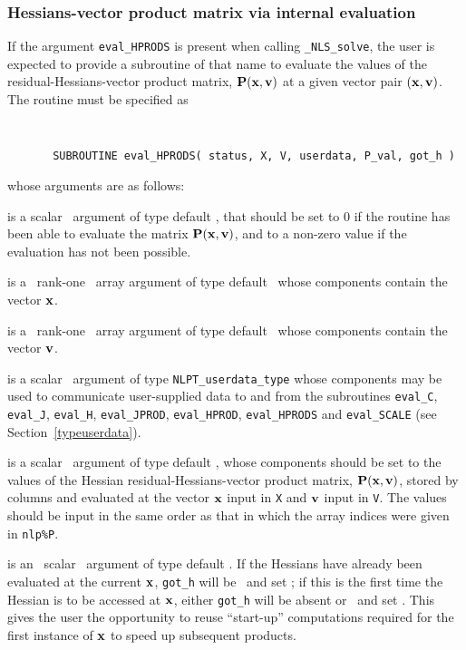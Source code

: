 \documentclass{galahad}
\newcommand{\packagename}{NLS}
\newcommand{\fullpackagename}{\libraryname\_\packagename}
\newcommand{\solver}{{\tt \fullpackagename\_solve}}
\begin{document}

\subsubsection{Hessians-vector product matrix via internal evaluation\label{hpfv}}

If the argument {\tt eval\_HPRODS} is present when calling \solver, the
user is expected to provide a subroutine of that name to evaluate the
values of the residual-Hessians-vector product matrix, ${\mathbf{P}}({\mathbf{x}},{\mathbf{v}})$
at a given vector pair $({\mathbf{x}},{\mathbf{v}})$.
The routine must be specified as
\def\baselinestretch{0.8}
{\tt
\begin{verbatim}
       SUBROUTINE eval_HPRODS( status, X, V, userdata, P_val, got_h )
\end{verbatim} }
\def\baselinestretch{1.0}
\noindent whose arguments are as follows:

\begin{description}
 is a scalar \intentout\ argument of type default \integer,
that should be set to 0 if the routine has been able to evaluate the
matrix ${\mathbf{P}}({\mathbf{x}},{\mathbf{v}})$,
and to a non-zero value if the evaluation has not been possible.

 is a \ rank-one \intentin\ array argument of type
default \realdp\ whose components contain the vector ${\mathbf{x}}$.

 is a \ rank-one \intentin\ array argument of type
default \realdp\ whose components contain the vector ${\mathbf{v}}$.

 is a scalar \intentinout\ argument of type
{\tt NLPT\_userdata\_type} whose components may be used
to communicate user-supplied data to and from the subroutines
{\tt eval\_C}, {\tt eval\_J}, {\tt eval\_H}, {\tt eval\_JPROD},
{\tt eval\_HPROD}, {\tt eval\_HPRODS} and {\tt eval\_SCALE}
(see Section~\ref{typeuserdata}).

 is a scalar \intentout\ argument of type default \realdp,
whose components should be set to the values of the Hessian
residual-Hessians-vector product matrix, ${\mathbf{P}}({\mathbf{x}},{\mathbf{v}})$,
stored by columns and evaluated at the vector ${\mathbf{x}}$ input in {\tt X}
and ${\mathbf{v}}$ input in {\tt V}.
The values should be input in the same order as that in which the array
indices were given in {\tt nlp\%P}.

 is an \optional\ scalar \intentin\ argument of type default
\logical. If the Hessians have already been evaluated at the current
${\mathbf{x}}$, {\tt got\_h} will be \present\ and set \true; if this is the first time
the Hessian is to be accessed at ${\mathbf{x}}$, either {\tt got\_h} will
be absent or \present\ and set \false. This gives the user the opportunity
to reuse ``start-up'' computations required for the first instance of
${\mathbf{x}}$ to speed up subsequent products.

\end{description}
\end{document}
